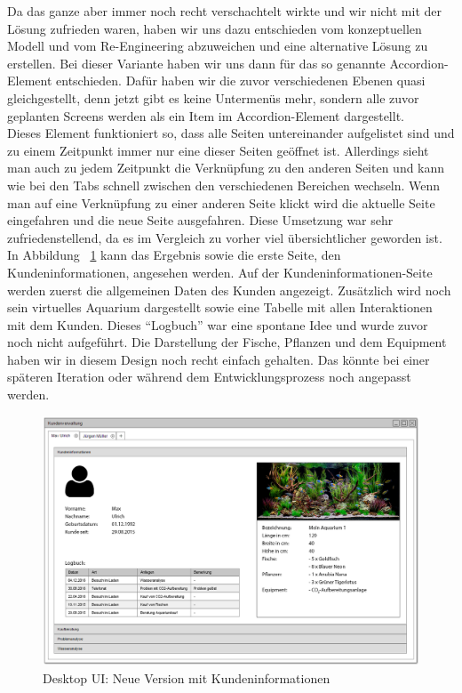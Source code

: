 Da das ganze aber immer noch recht verschachtelt wirkte und wir nicht mit der Lösung zufrieden waren, haben wir uns dazu entschieden vom konzeptuellen Modell und vom Re-Engineering abzuweichen und eine alternative Lösung zu erstellen. Bei dieser Variante haben wir uns dann für das so genannte Accordion-Element entschieden. Dafür haben wir die zuvor verschiedenen Ebenen quasi gleichgestellt, denn jetzt gibt es keine Untermenüs mehr, sondern alle zuvor geplanten Screens werden als ein Item im Accordion-Element dargestellt. \\
Dieses Element funktioniert so, dass alle Seiten untereinander aufgelistet sind und zu einem Zeitpunkt immer nur eine dieser Seiten geöffnet ist. Allerdings sieht man auch zu jedem Zeitpunkt die Verknüpfung zu den anderen Seiten und kann wie bei den Tabs schnell zwischen den verschiedenen Bereichen wechseln. Wenn man auf eine Verknüpfung zu einer anderen Seite klickt wird die aktuelle Seite eingefahren und die neue Seite ausgefahren. Diese Umsetzung war sehr zufriedenstellend, da es im Vergleich zu vorher viel übersichtlicher geworden ist. 
\\In Abbildung ~\ref{desktopUI:2} kann das Ergebnis sowie die erste Seite, den Kundeninformationen, angesehen werden. Auf der Kundeninformationen-Seite werden zuerst die allgemeinen Daten des Kunden angezeigt. Zusätzlich wird noch sein virtuelles Aquarium dargestellt sowie eine Tabelle mit allen Interaktionen mit dem Kunden. Dieses ``Logbuch'' war eine spontane Idee und wurde zuvor noch nicht aufgeführt. Die Darstellung der Fische, Pflanzen und dem Equipment haben wir in diesem Design noch recht einfach gehalten. Das könnte bei einer späteren Iteration oder während dem Entwicklungsprozess noch angepasst werden.

\begin{figure}[ht!]
\centering
\includegraphics[width=\linewidth]{2Kundeninformation}
\caption{Desktop UI: Neue Version mit Kundeninformationen}
\label{desktopUI:2}
\end{figure}

